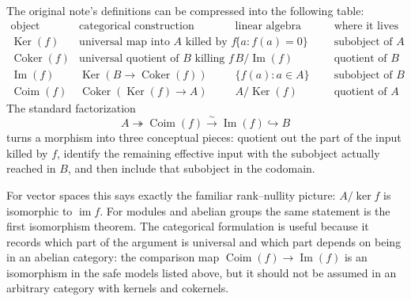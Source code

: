 The original note's definitions can be compressed into the following table:
\[
\begin{array}{c|c|c|c}
\text{object} & \text{categorical construction} & \text{linear algebra model} & \text{where it lives}\\
\hline
\operatorname{Ker}(f) & \text{universal map into }A\text{ killed by }f & \{a:f(a)=0\} & \text{subobject of }A\\
\operatorname{Coker}(f) & \text{universal quotient of }B\text{ killing }f & B/\operatorname{Im}(f) & \text{quotient of }B\\
\operatorname{Im}(f) & \operatorname{Ker}(B\to\operatorname{Coker}(f)) & \{f(a):a\in A\} & \text{subobject of }B\\
\operatorname{Coim}(f) & \operatorname{Coker}(\operatorname{Ker}(f)\to A) & A/\operatorname{Ker}(f) & \text{quotient of }A
\end{array}
\]
The standard factorization
\[
  A\twoheadrightarrow \operatorname{Coim}(f)
  \xrightarrow{\sim}
  \operatorname{Im}(f)\hookrightarrow B
\]
turns a morphism into three conceptual pieces: quotient out the part of the input killed by \(f\), identify the remaining effective input with the subobject actually reached in \(B\), and then include that subobject in the codomain.

For vector spaces this says exactly the familiar rank--nullity picture: \(A/\ker f\) is isomorphic to \(\operatorname{im}f\).  For modules and abelian groups the same statement is the first isomorphism theorem.  The categorical formulation is useful because it records which part of the argument is universal and which part depends on being in an abelian category: the comparison map \(\operatorname{Coim}(f)\to\operatorname{Im}(f)\) is an isomorphism in the safe models listed above, but it should not be assumed in an arbitrary category with kernels and cokernels.
